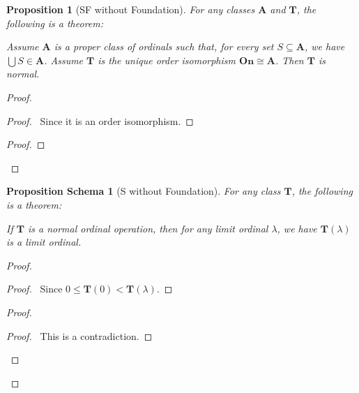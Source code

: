 \documentclass{book}
\let\qed\relax
\newtheorem{prop}[ax]{Proposition}
\newtheorem{props}[ax]{Proposition Schema}
\theoremstyle{definition}
\begin{document}
\begin{prop}[SF without Foundation]
\label{prop:enumerationnormal}
For any classes $\mathbf{A}$ and $\mathbf{T}$, the following is a theorem:

Assume $\mathbf{A}$ is a proper class of ordinals such that, for every set $S \subseteq \mathbf{A}$, we have $\bigcup S \in \mathbf{A}$. Assume $\mathbf{T}$ is the unique order isomorphism $\mathbf{On} \cong \mathbf{A}$. Then $\mathbf{T}$ is normal.
\end{prop}

\begin{proof}
\pf
{}
\begin{proof}
	\pf\ Since it is an order isomorphism.
\end{proof}
\begin{proof}
\end{proof}
\qed
\end{proof}

\begin{props}[S without Foundation]
For any class $\mathbf{T}$, the following is a theorem:

If $\mathbf{T}$ is a normal ordinal operation, then for any limit ordinal $\lambda$, we have $\mathbf{T}(\lambda)$ is a limit ordinal.
\end{props}

\begin{proof}
\pf
{}
\begin{proof}
	\pf\ Since $0 \leq \mathbf{T}(0) < \mathbf{T}(\lambda)$.
\end{proof}
\begin{proof}
	\qedstep
	\begin{proof}
		\pf\ This is a contradiction.
	\end{proof}
\end{proof}
\qed
\end{proof}
\end{document}
